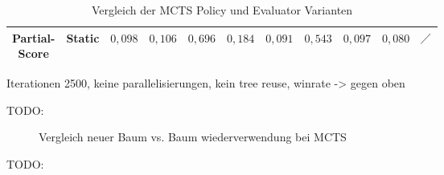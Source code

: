 \begin{table}[H]
{\begin{tabular}{|c|c|c|c|c|c|c|c|c|c|c|}
            \tiny \makecell{Partial-                                                                                                                                                                                                                                                                                                                                                              \\Score} &        Static & \cellcolor[HTML]{f9826f}$0{,}098$ & \cellcolor[HTML]{f98470}$0{,}106$ & \cellcolor[HTML]{c2da81}$0{,}696$ & \cellcolor[HTML]{fa9874}$0{,}184$ & \cellcolor[HTML]{f9806f}$0{,}091$ & \cellcolor[HTML]{f2e884}$0{,}543$ & \cellcolor[HTML]{f9826f}$0{,}097$ & \cellcolor[HTML]{f97d6e}$0{,}080$ & $\diagup$                         \\ \hline
        \end{tabular}}
    \vspace{3pt}
    \caption{Vergleich der \acs{MCTS} Policy und Evaluator Varianten}
    \label{tabelle:mcts-policy-eval-comparision}
\end{table}

Iterationen 2500, keine parallelisierungen, kein tree reuse, winrate -> gegen oben

TODO:

\begin{figure}[!ht]
    \centering
    \caption[Vergleich neuer Baum vs. Baum wiederverwendung bei MCTS]{Vergleich neuer Baum vs. Baum wiederverwendung bei \acs{MCTS}}
    \label{fig:mcts-tree-reuse-comparision}
\end{figure}

TODO:

